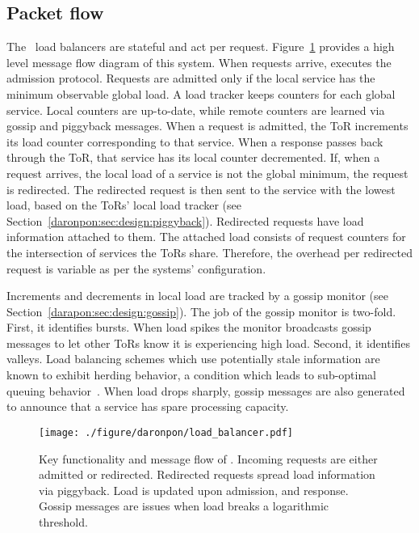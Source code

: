 \subsection{Packet flow}

The \daronpon\ load balancers are stateful and act per request.
Figure~\ref{fig:load_balancer} provides a high level message flow diagram of
this system.  When requests arrive, \daronpon executes the admission
protocol. Requests are admitted only if the local service has the minimum
observable global load. A load tracker keeps counters for each global service.
Local counters are up-to-date, while remote counters are learned via gossip and
piggyback messages.  When a request is admitted, the ToR increments its load
counter corresponding to that service.  When a response passes back through the
ToR, that service has its local counter decremented.  If, when a request
arrives, the local load of a service is not the global minimum, the request is
redirected. The redirected request is then sent to the service with the lowest
load, based on the ToRs' local load tracker (see
Section~\ref{daronpon:sec:design:piggyback}).  Redirected requests have load information
attached to them. The attached load consists of request counters for the
intersection of services the ToRs share.  Therefore, the overhead per
redirected request is variable as per the systems' configuration.

Increments and decrements in local load are tracked by a gossip monitor (see
Section~\ref{darapon:sec:design:gossip}). The job of the gossip monitor is two-fold. First,
it identifies bursts. When load spikes the monitor broadcasts gossip messages
to let other ToRs know it is experiencing high load. Second, it identifies
valleys. Load balancing schemes which use potentially stale information are
known to exhibit herding behavior, a condition which leads to sub-optimal
queuing behavior~\cite{dahlin_stale_info,mitzenmacher_old_info}. When load
drops sharply, gossip messages are also generated to announce that a service
has spare processing capacity.

\begin{figure}[t]
  \centering
    \texttt{[image: ./figure/daronpon/load\_balancer.pdf]}
    \centering

    \caption{ %
        Key functionality and message flow of \daronpon.
        Incoming requests are either admitted or redirected.
        Redirected requests spread load information via piggyback.
        Load is updated upon admission, and response.  Gossip messages
        are issues when load breaks a logarithmic threshold.}

  \label{fig:load_balancer}
\end{figure}

